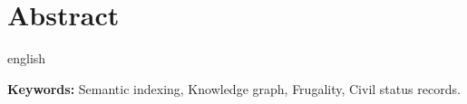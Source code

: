 \clearpage
\chapter*{Abstract}
\thispagestyle{plain} %

\begin{otherlanguage*}{english}

    \vspace{1em}
    \noindent\textbf{Keywords:} Semantic indexing, Knowledge graph, Frugality, Civil status records.
\end{otherlanguage*}